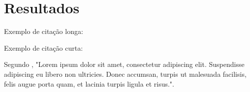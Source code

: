 \chapter{Resultados}

Exemplo de citação longa:

\begin{citacao}
\lipsum[1] \cite[5.3]{abntex2cite-alf}
\end{citacao}

Exemplo de citação curta:

Segundo \cite{abntex2cite}, "Lorem ipsum dolor sit amet, consectetur adipiscing elit. Suspendisse adipiscing eu libero non ultricies. Donec accumsan, turpis ut malesuada facilisis, felis augue porta quam, et lacinia turpis ligula et risus.".